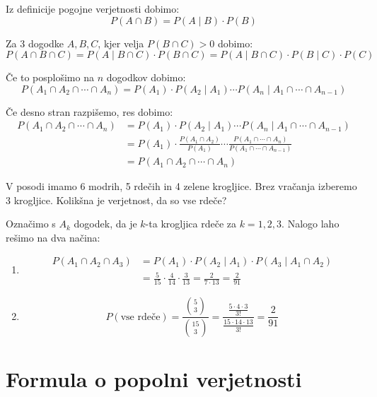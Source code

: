 \documentclass[12pt]{book}
\def\n{\noindent}
\theoremstyle{definition}
\theoremstyle{plain}
\theoremstyle{plain}
\theoremstyle{plain}
\theoremstyle{remark}
\begin{document}
\n Iz definicije pogojne verjetnosti dobimo:
$$
P(A \cap B)=P(A \mid B) \cdot P(B)  
$$

\n Za 3 dogodke $A, B, C$, kjer velja $P(B \cap C)>0$ dobimo:
$$
P(A \cap B \cap C)=P(A \mid B \cap C) \cdot P(B \cap C)=P(A \mid B \cap C) \cdot P(B \mid C) \cdot P(C)
$$

\n Če to posplošimo na $n$ dogodkov dobimo: 
$$
P\left(A_1 \cap A_2 \cap \cdots \cap A_n\right) =P\left(A_1\right) \cdot P\left(A_2 \mid A_1\right) \cdots P\left(A_n \mid A_1 \cap \cdots \cap A_{n-1}\right) 
$$

\n Če desno stran razpišemo, res dobimo: 
$$
\begin{aligned}
    P\left(A_1 \cap A_2 \cap \cdots \cap A_n\right) &=P\left(A_1\right) \cdot P\left(A_2 \mid A_1\right) \cdots P\left(A_n \mid A_1 \cap \cdots \cap A_{n-1}\right) \\
    &=P\left(A_1\right) \cdot \frac{P\left(A_1 \cap A_2\right)}{P\left(A_1\right)} \cdots \frac{P\left(A_1 \cap \cdots \cap A_n\right)}{P\left(A_1 \cap \cdots \cap A_{n-1}\right)} \\
    &=P\left(A_1 \cap A_2 \cap \cdots \cap A_n\right)
\end{aligned}
$$

\begin{zgled}
    V posodi imamo 6 modrih, 5 rdečih in 4 zelene krogljice. Brez vračanja izberemo 3 krogljice. Kolikšna je verjetnost, da so vse rdeče?

    Označimo s $A_k$ dogodek, da je $k$-ta krogljica rdeče za $k=1, 2, 3$. Nalogo laho rešimo na dva načina:

    \begin{enumerate}
        \item 
        $$
        \begin{aligned}
            P\left(A_1 \cap A_2 \cap A_3\right) &=P\left(A_1\right) \cdot P\left(A_2 \mid A_1\right) \cdot P\left(A_3 \mid A_1 \cap A_2\right) \\
            &=\frac{5}{15} \cdot \frac{4}{14} \cdot \frac{3}{13}=\frac{2}{7 \cdot 13}=\frac{2}{91}
        \end{aligned}
        $$
        \item $$ P(\text{vse rdeče}) = \frac{\binom{5}{3}}{\binom{15}{3}}=\frac{\frac{5 \cdot 4 \cdot 3}{3 !}}{\frac{15 \cdot 14 \cdot 13}{3 !}}=\frac{2}{91} $$
    \end{enumerate}
\end{zgled}

\section{Formula o popolni verjetnosti}
\end{document}
